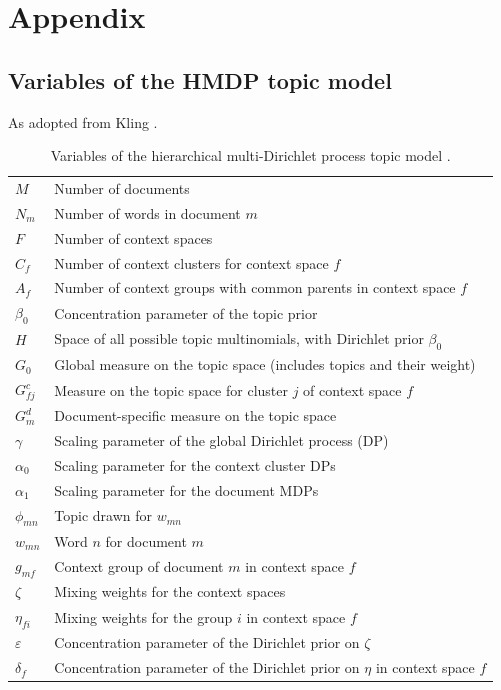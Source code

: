 \appendix
\section{Appendix}
\subsection{Variables of the HMDP topic model}
\label{hmdpvars}
As adopted from Kling \cite{DBLP:phd/dnb/Kling16}.
\begin{table}[H]
\caption{Variables of the hierarchical multi-Dirichlet process topic model \cite{DBLP:phd/dnb/Kling16}.}
\begin{tabular}{ll}
\hline
$M$ & Number of documents \\
$N_m$ & Number of words in document $m$ \\
$F$ & Number of context spaces \\
$C_f$ & Number of context clusters for context space $f$ \\
$A_f$ & Number of context groups with common parents in context space $f$ \\
$\beta_0$ & Concentration parameter of the topic prior \\
$H$ & Space of all possible topic multinomials, with Dirichlet prior $\beta_0$ \\
$G_0$ & Global measure on the topic space (includes topics and their weight) \\
$G_{fj}^c$ & Measure on the topic space for cluster $j$ of context space $f$ \\
$G_m^d$ & Document-specific measure on the topic space \\
$\gamma$ & Scaling parameter of the global Dirichlet process (DP) \\
$\alpha_0$ & Scaling parameter for the context cluster DPs \\
$\alpha_1$ & Scaling parameter for the document MDPs \\
$\phi_{mn}$ & Topic drawn for $w_{mn}$ \\
$w_{mn}$ & Word $n$ for document $m$ \\
$g_{mf}$ & Context group of document $m$ in context space $f$ \\
$\zeta$ & Mixing weights for the context spaces \\
$\eta_{fi}$ & Mixing weights for the group $i$ in context space $f$ \\
$\varepsilon$ & Concentration parameter of the Dirichlet prior on $\zeta$ \\
$\delta_f$ & Concentration parameter of the Dirichlet prior on $\eta$ in context space $f$
\end{tabular}
\end{table}

